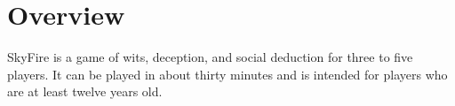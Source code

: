 \documentclass[a6paper, 12pt, parskip=half, DIV=14]{scrartcl}
\begin{document}
\begin{titlepage}
\phantom{SkyFire}
\end{titlepage}


\ClearShipoutPicture
\enlargethispage{1.75\baselineskip}
\section*{Overview}
SkyFire is a game of wits, deception, and social deduction for three to five players. It can be played in about thirty minutes and is intended for players who are at least twelve years old.
\end{document}
